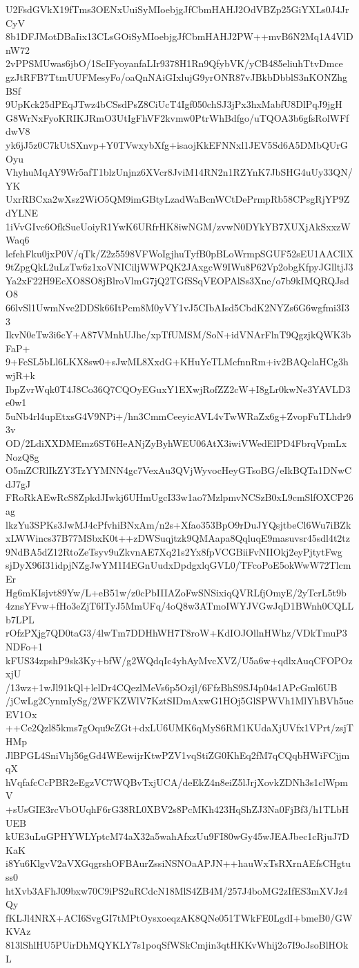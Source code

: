 U2FsdGVkX19fTms3OENxUuiSyMIoebjgJfCbmHAHJ2OdVBZp25GiYXLs0J4JrCyV
8b1DFJMotDBaIix13CLsGOiSyMIoebjgJfCbmHAHJ2PW++mvB6N2Mq1A4VlDnW72
2vPPSMUwas6jbO/1ScIFyoyanfaLIr9378H1Rn9QfybVK/yCB485eliuhTtvDmce
gzJtRFB7TtmUUFMesyFo/oaQnNAiGIxlujG9yrONR87vJBkbDbblS3nKONZhgBSf
9UpKck25dPEqJTwz4bCSsdPsZ8CiUcT4Igf050chSJ3jPx3hxMabfU8DlPqJ9jgH
G8WrNxFyoKRIKJRmO3UtIgFhVF2kvmw0PtrWhBdfgo/uTQOA3b6gfsRolWFfdwV8
yk6jJ5z0C7kUtSXnvp+Y0TVwxybXfg+isaojKkEFNNxl1JEV5Sd6A5DMbQUrGOyu
VhyhuMqAY9Wr5afT1blzUnjnz6XVcr8JviM14RN2n1RZYnK7JbSHG4uUy33QN/YK
UxrRBCxa2wXsz2WiO5QM9imGBtyLzadWaBcnWCtDePrmpRb58CPsgRjYP9ZdYLNE
1iVvGIvc6OfkSueUoiyR1YwK6URfrHK8iwNGM/zvwN0DYkYB7XUXjAkSxxzWWaq6
lefehFku0jxP0V/qTk/Z2z5598VFWoIgjhuTyfB0pBLoWrmpSGUF52sEU1AACIlX
9tZpgQkL2uLzTw6z1xoVNICiljWWPQK2JAxgcW9IWu8P62Vp2obgKfpyJGlltjJ3
Ya2xF22H9EcXO8SO8jBlroVlmG7jQ2TGfSSqVEOPAlSs3Xne/o7b9kIMQRQJsdO8
66lvSl1UwmNve2DDSk66ItPcm8M0yVY1vJ5CIbAIsd5CbdK2NYZs6G6wgfmi3I33
IkvN0eTw3i6cY+A87VMnhUJhe/xpTfUMSM/SoN+idVNArFlnT9QgzjkQWK3bFaP+
9+FcSL5bLl6LKX8sw0+sJwML8XxdG+KHuYeTLMcfnnRm+iv2BAQclaHCg3hwjR+k
IbpZvrWqk0T4J8Co36Q7CQOyEGuxY1EXwjRofZZ2cW+I8gLr0kwNe3YAVLD3e0w1
5uNb4rl4upEtxsG4V9NPi+/hn3CmmCeeyicAVL4vTwWRaZx6g+ZvopFuTLhdr93v
OD/2LdiXXDMEmz6ST6HeANjZyByhWEU06AtX3iwiVWedElPD4FbrqVpmLxNozQ8g
O5mZCRlIkZY3TzYYMNN4gc7VexAu3QVjWyvocHeyGTsoBG/eIkBQTa1DNwCdJ7gJ
FRoRkAEwRcS8ZpkdJIwkj6UHmUgcI33w1ao7MzlpmvNCSzB0xL9cmSlfOXCP26ag
lkzYu3SPKs3JwMJ4cPfvhiBNxAm/n2s+Xfao353BpO9rDuJYQsjtbeCl6Wu7iBZk
xLWWincs37B77MSbxK0t++zDWSuqjtzk9QMAapa8QqluqE9masuvsr45sdl4t2tz
9NdBA5dZ12RtoZeTsyv9uZkvnAE7Xq21s2Yx8fpVCGBiiFvNIIOkj2eyPjtytFwg
sjDyX96I31idpjNZgJwYM1I4EGnUudxDpdgxlqGVL0/TFcoPoE5okWwW72TlcmEr
Hg6mKIsjvt89Yw/L+eB51w/z0cPbIIIAZoFwSNSixiqQVRLfjOmyE/2yTcrL5t9b
4znsYFvw+fHo3eZjT6lTyJ5MmUFq/4oQ8w3ATmoIWYJVGwJqD1BWnh0CQLLb7LPL
rOfzPXjg7QD0taG3/4lwTm7DDHhWH7T8roW+KdIOJOllnHWhz/VDkTmuP3NDFo+1
kFUS34zpshP9sk3Ky+bfW/g2WQdqIc4yhAyMvcXVZ/U5a6w+qdlxAuqCFOPOzxjU
/13wz+1wJl91kQl+lelDr4CQezlMeVs6p5Ozjl/6FfzBhS9SJ4p04s1APcGml6UB
/jCwLg2CynmIySg/2WFKZWlV7KztSIDmAxwG1HOj5GlSPWVh1MlYhBVh5ueEV1Ox
++Ce2Qzl85kms7gOqu9cZGt+dxLU6UMK6qMyS6RM1KUdaXjUVfx1VPrt/zsjTHMp
JlBPGL4SniVhj56gGd4WEewijrKtwPZV1vqStiZG0KhEq2fM7qCQqbHWiFCjjmqX
hVqfafcCcPBR2eEgzVC7WQBvTxjUCA/deEkZ4n8eiZ5lJrjXovkZDNh3s1clWpmV
+sUsGIE3rcVbOUqhF6rG38RL0XBV2s8PcMKh423HqShZJ3Na0FjBf3/h1TLbHUEB
kUE3uLuGPHYWLYptcM74aX32a5wahAfxzUu9FI80wGy45wJEAJbec1cRjuJ7DKaK
i8Yu6KlgvV2aVXGqgrshOFBAurZssiNSNOaAPJN++hauWxTsRXrnAEfsCHgtuss0
htXvb3AFhJ09bxw70C9iPS2uRCdcN18MlS4ZB4M/257J4boMG2zIfES3mXVJz4Qy
fKLJl4NRX+ACI6SvgGI7tMPtOysxoeqzAK8QNe051TWkFE0LgdI+bmeB0/GWKVAz
813lShlHU5PUirDhMQYKLY7s1poqSfWSkCmjin3qtHKKvWhij2o7I9oJsoBlHOkL
